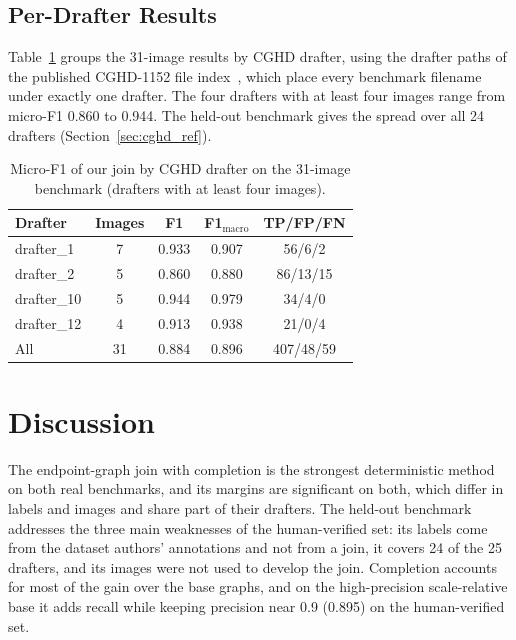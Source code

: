 \documentclass[journal]{IEEEtran}
\begin{document}
\subsection{Per-Drafter Results}

Table~\ref{tab:per_drafter} groups the 31-image results by CGHD drafter, using the drafter paths of the published CGHD-1152 file index~\cite{cghd1152data}, which place every benchmark filename under exactly one drafter. The four drafters with at least four images range from micro-F1 0.860 to 0.944. The held-out benchmark gives the spread over all 24 drafters (Section~\ref{sec:cghd_ref}).

\begin{table}[t]
\caption{Micro-F1 of our join by CGHD drafter on the 31-image benchmark (drafters with at least four images).}
\label{tab:per_drafter}
\centering
\footnotesize
\begin{tabular}{lcccc}
\toprule
\textbf{Drafter} & \textbf{Images} & \textbf{F1} & \textbf{F1$_{\text{macro}}$} & \textbf{TP/FP/FN} \\
\midrule
drafter\_1  & 7 & 0.933 & 0.907 & 56/6/2 \\
drafter\_2  & 5 & 0.860 & 0.880 & 86/13/15 \\
drafter\_10 & 5 & 0.944 & 0.979 & 34/4/0 \\
drafter\_12 & 4 & 0.913 & 0.938 & 21/0/4 \\
\midrule
All         & 31 & 0.884 & 0.896 & 407/48/59 \\
\bottomrule
\end{tabular}
\end{table}

\section{Discussion}
\label{sec:discussion}

The endpoint-graph join with completion is the strongest deterministic method on both real benchmarks, and its margins are significant on both, which differ in labels and images and share part of their drafters. The held-out benchmark addresses the three main weaknesses of the human-verified set: its labels come from the dataset authors' annotations and not from a join, it covers 24 of the 25 drafters, and its images were not used to develop the join. Completion accounts for most of the gain over the base graphs, and on the high-precision scale-relative base it adds recall while keeping precision near 0.9 (0.895) on the human-verified set.
\end{document}
